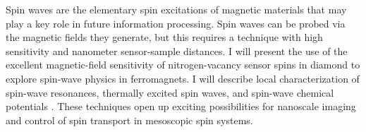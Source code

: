 Spin waves are the elementary spin excitations of magnetic materials that may play a key role in future information processing. Spin waves can be probed via the magnetic fields they generate, but this requires a technique with high sensitivity and nanometer sensor-sample distances. I will present the use of the excellent magnetic-field sensitivity of nitrogen-vacancy sensor spins in diamond to explore spin-wave physics in ferromagnets. I will describe local characterization of spin-wave resonances, thermally excited spin waves, and spin-wave chemical potentials . These techniques open up exciting possibilities for nanoscale imaging and control of spin transport in mesoscopic spin systems.